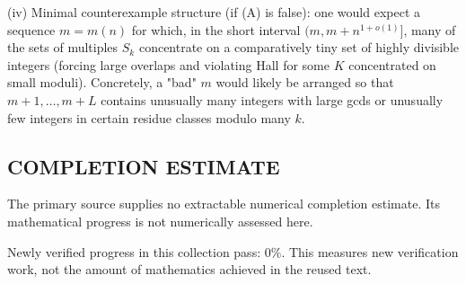 (iv) Minimal counterexample structure (if (A) is false): one would expect a sequence $m=m(n)$ for which, in the short interval $(m,m+n^{1+o(1)}]$, many of the sets of multiples $S_k$ concentrate on a comparatively tiny set of highly divisible integers (forcing large overlaps and violating Hall for some $K$ concentrated on small moduli). Concretely, a "bad" $m$ would likely be arranged so that $m+1,\dots,m+L$ contains unusually many integers with large gcds or unusually few integers in certain residue classes modulo many $k$.




\subsection*{COMPLETION ESTIMATE}
The primary source supplies no extractable numerical completion estimate. Its mathematical progress is not numerically assessed here.

Newly verified progress in this collection pass: $0\%$. This measures new verification work, not the amount of mathematics achieved in the reused text.
